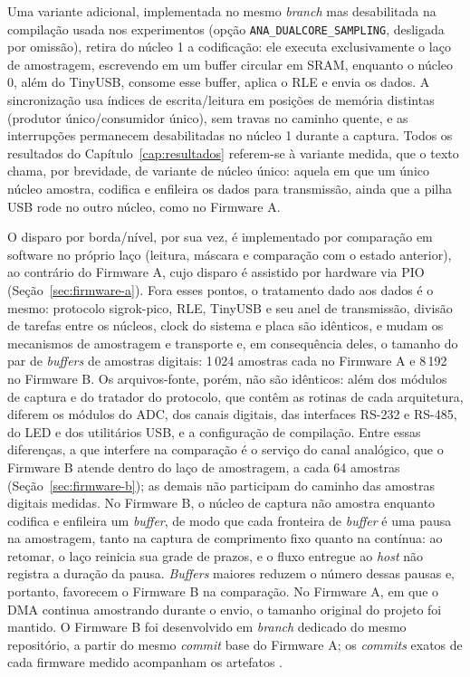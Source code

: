 Uma variante adicional, implementada no mesmo \emph{branch} mas desabilitada
na compilação usada nos experimentos (opção \texttt{ANA\_DUALCORE\_SAMPLING},
desligada por omissão), retira do núcleo 1 a codificação: ele executa
exclusivamente o laço de amostragem, escrevendo em um buffer circular em
\ac{SRAM}, enquanto o núcleo 0, além do TinyUSB, consome esse buffer, aplica o
\ac{RLE} e envia os dados. A sincronização usa índices de escrita/leitura em
posições de memória distintas (produtor único/consumidor único), sem travas no
caminho quente, e as interrupções permanecem desabilitadas no núcleo 1 durante
a captura. Todos os resultados do Capítulo~\ref{cap:resultados} referem-se à
variante medida, que o texto chama, por brevidade, de variante de núcleo
único: aquela em que um único núcleo amostra, codifica e enfileira os dados
para transmissão, ainda que a pilha \ac{USB} rode no outro núcleo, como no
Firmware A.

O disparo por borda/nível, por sua vez, é implementado por comparação em
software no próprio laço (leitura, máscara e comparação com o estado anterior),
ao contrário do Firmware A, cujo disparo é assistido por hardware via \ac{PIO}
(Seção~\ref{sec:firmware-a}). Fora esses pontos, o tratamento dado aos dados
é o mesmo: protocolo sigrok-pico, \ac{RLE}, TinyUSB e seu anel de
transmissão, divisão de tarefas entre os núcleos, clock do sistema e placa são
idênticos, e mudam os mecanismos de amostragem e transporte e, em consequência
deles, o tamanho do par de \emph{buffers} de amostras digitais: 1\,024
amostras cada no Firmware A e 8\,192 no Firmware B. Os arquivos-fonte, porém,
não são idênticos: além dos módulos de captura e do tratador do protocolo, que
contêm as rotinas de cada arquitetura, diferem os módulos do \ac{ADC}, dos
canais digitais, das interfaces RS-232 e RS-485, do \acs{LED} e dos utilitários
\ac{USB}, e a configuração de compilação. Entre essas diferenças, a que
interfere na comparação é o serviço do canal analógico, que o Firmware B
atende dentro do laço de amostragem, a cada 64 amostras
(Seção~\ref{sec:firmware-b}); as demais não participam do caminho das amostras
digitais medidas.
No Firmware B, o núcleo de captura não amostra enquanto codifica e enfileira
um \emph{buffer}, de modo que cada fronteira de \emph{buffer} é uma pausa na
amostragem, tanto na captura de comprimento fixo quanto na contínua: ao
retomar, o laço reinicia sua grade de prazos, e o fluxo entregue ao
\emph{host} não registra a duração da pausa. \emph{Buffers} maiores reduzem o
número dessas pausas e, portanto, favorecem o Firmware B na comparação. No
Firmware A, em que o \ac{DMA} continua amostrando durante o envio, o tamanho
original do projeto foi mantido. O Firmware B foi desenvolvido em
\emph{branch} dedicado do mesmo repositório, a partir do mesmo \emph{commit}
base do Firmware A; os \emph{commits} exatos de cada firmware medido
acompanham os artefatos \cite{dias2026artefatos}.

